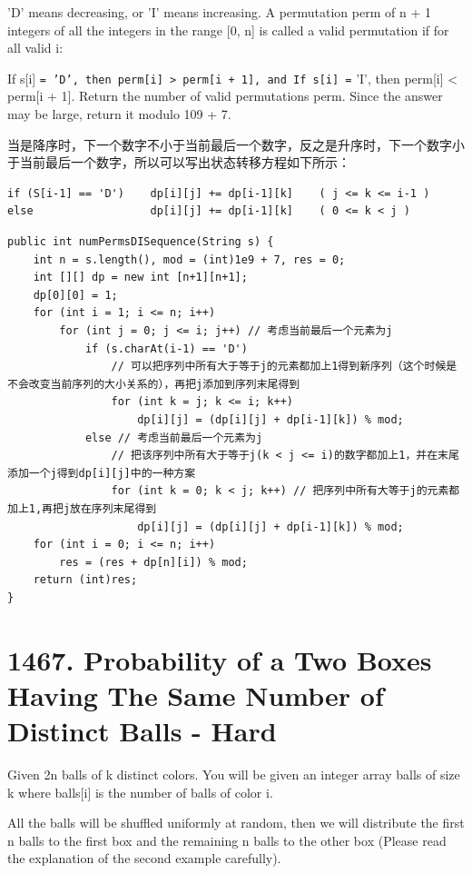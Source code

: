 \documentclass[9pt, b5paaper]{book}
\begin{document}
'D' means decreasing, or
'I' means increasing.
A permutation perm of n + 1 integers of all the integers in the range [0, n] is called a valid permutation if for all valid i:

If s[i] \texttt{= 'D', then perm[i] > perm[i + 1], and
If s[i] =} 'I', then perm[i] < perm[i + 1].
Return the number of valid permutations perm. Since the answer may be large, return it modulo 109 + 7.

当是降序时，下一个数字不小于当前最后一个数字，反之是升序时，下一个数字小于当前最后一个数字，所以可以写出状态转移方程如下所示：
\begin{verbatim}
if (S[i-1] == 'D')    dp[i][j] += dp[i-1][k]    ( j <= k <= i-1 )
else                  dp[i][j] += dp[i-1][k]    ( 0 <= k < j )
\end{verbatim}
\begin{verbatim}
public int numPermsDISequence(String s) {
    int n = s.length(), mod = (int)1e9 + 7, res = 0;
    int [][] dp = new int [n+1][n+1];
    dp[0][0] = 1;
    for (int i = 1; i <= n; i++) 
        for (int j = 0; j <= i; j++) // 考虑当前最后一个元素为j
            if (s.charAt(i-1) == 'D')
                // 可以把序列中所有大于等于j的元素都加上1得到新序列（这个时候是不会改变当前序列的大小关系的），再把j添加到序列末尾得到
                for (int k = j; k <= i; k++) 
                    dp[i][j] = (dp[i][j] + dp[i-1][k]) % mod;
            else // 考虑当前最后一个元素为j
                // 把该序列中所有大于等于j(k < j <= i)的数字都加上1，并在末尾添加一个j得到dp[i][j]中的一种方案
                for (int k = 0; k < j; k++) // 把序列中所有大等于j的元素都加上1,再把j放在序列末尾得到
                    dp[i][j] = (dp[i][j] + dp[i-1][k]) % mod;
    for (int i = 0; i <= n; i++) 
        res = (res + dp[n][i]) % mod;
    return (int)res;
}
\end{verbatim}

\section{1467. Probability of a Two Boxes Having The Same Number of Distinct Balls - Hard}
\label{sec-16-2}
Given 2n balls of k distinct colors. You will be given an integer array balls of size k where balls[i] is the number of balls of color i. 

All the balls will be shuffled uniformly at random, then we will distribute the first n balls to the first box and the remaining n balls to the other box (Please read the explanation of the second example carefully).
\end{document}
